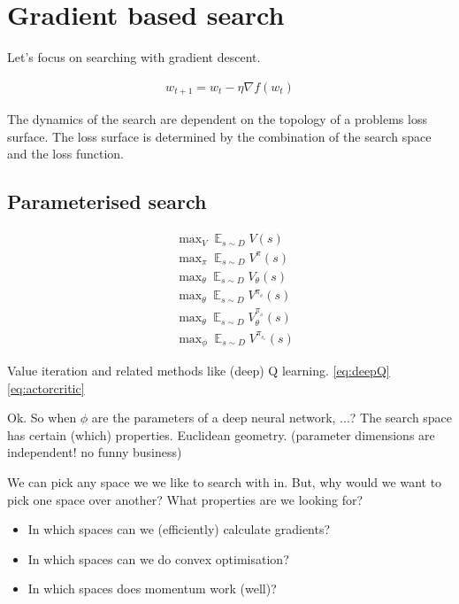 \section{Gradient based search}

Let's focus on searching with gradient descent.

\begin{align}
w_{t+1} = w_t - \eta \nabla f(w_t)
\end{align}

The dynamics of the search are dependent on the topology of a problems loss surface.
The loss surface is determined by the combination of the search space and the loss function.

\subsection{Parameterised search}

\begin{align}
&\mathop{\text{max}}_V \mathop{\mathbb E}_{s\sim D} V(s) \\
&\mathop{\text{max}}_{\pi} \mathop{\mathbb E}_{s\sim D}V^{\pi}(s) \\
&\mathop{\text{max}}_{\theta} \mathop{\mathbb E}_{s\sim D} V_{\theta}(s)\label{eq:deepQ}\\
&\mathop{\text{max}}_{\theta} \mathop{\mathbb E}_{s\sim D} V^{\pi_{_{\theta}}}(s) \\
&\mathop{\text{max}}_{\theta} \mathop{\mathbb E}_{s\sim D} V_{\theta}^{\pi_{_{\phi}}}(s)\label{eq:actorcritic} \\
&\mathop{\text{max}}_{\phi} \mathop{\mathbb E}_{s\sim D} V^{\pi_{_{\theta_{\phi}}}}(s)
\end{align}

Value iteration and related methods like (deep) Q learning. \eqref{eq:deepQ}
\eqref{eq:actorcritic}

Ok. So when $\phi$ are the parameters of a deep neural network, ...? The search space has certain (which) properties.
Euclidean geometry.
(parameter dimensions are independent! no funny business)

We can pick any space we we like to search with in. But, why would we want to pick one space over another?
What properties are we looking for?

\begin{itemize}
\tightlist
\item
  In which spaces can we (efficiently) calculate gradients?
\item
  In which spaces can we do convex optimisation?
\item
  In which spaces does momentum work (well)?
\end{itemize}


